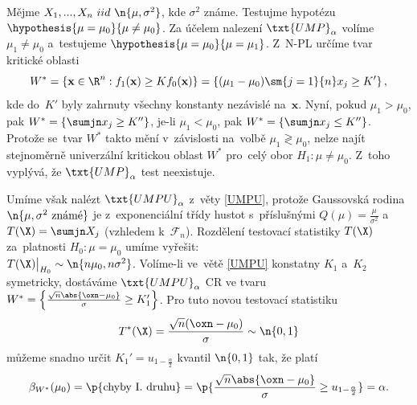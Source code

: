 \begin{example}
	Mějme $X_1,...,X_n~iid~\n{\mu,\sigma^2}$, kde $\sigma^2$ známe. Testujme hypotézu \mbox{$\hypothesis{\mu=\mu_0}{\mu\neq\mu_0}$}.
	Za účelem nalezení $\txt{UMP}_\alpha$ volíme $\mu_1\neq\mu_0$ a~testujeme  $\hypothesis{\mu=\mu_0}{\mu=\mu_1}$. Z~N-PL určíme tvar kritické oblasti 
	$$ W^\ast=\left\{ \textbf{x}\in\R^n:f_1(\textbf{x})\geq Kf_0(\textbf{x}) \right\}=\left\{ (\mu_1-\mu_0)\sm{j=1}{n}x_j\geq K' \right\}, $$
	kde do~$K'$ byly zahrnuty všechny konstanty nezávislé na~$\textbf{x}$. Nyní, pokud $\mu_1>\mu_0$, pak $W^\ast=\left\{ \sumjn x_j\geq K'' \right\}$, je-li $\mu_1<\mu_0$, pak $W^\ast=\left\{ \sumjn x_j\leq K'' \right\}$. Protože se~tvar $W^\ast$ takto mění v~závislosti na~volbě $\mu_1\gtrless \mu_0$, nelze najít stejnoměrně univerzální kritickou oblast $W^\ast$ pro~celý obor $H_1:\mu\neq\mu_0$. Z~toho vyplývá, že $\txt{UMP}_\alpha$ test neexistuje. 
	
	Umíme však nalézt $\txt{UMPU}_\alpha$ z~věty \ref{UMPU}, protože Gaussovská rodina $\n{\mu,\sigma^2\text{ známé}}$ je z~exponenciální třídy hustot s~příslušnými $Q(\mu)=\frac{\mu}{\sigma^2}$ a~$T(\X)=\sumjn X_j$ (vzhledem k~$\mathcal{F}_n$). Rozdělení testovací statistiky $T(\X)$ za~platnosti $H_0:\mu=\mu_0$ umíme vyřešit: \\$T(\X)\big|_{H_0}\sim\n{n\mu_0,n\sigma^2}$. Volíme-li ve~větě \ref{UMPU} konstatny $K_1$ a~$K_2$ symetricky, dostáváme $\txt{UMPU}_\alpha$ CR ve tvaru \mbox{$W^\ast=\left\{ \frac{\sqrt{n}\abs{\oxn-\mu_0}}{\sigma}\geq K_1' \right\}$}. Pro tuto novou testovací statistiku $$T^\ast(\X)=\frac{\sqrt{n}(\oxn-\mu_0)}{\sigma}\sim\n{0,1}$$ můžeme snadno určit $K_1'=u_{1-\frac{\alpha}{2}}$ kvantil $\n{0,1}$ tak, že platí $$ \beta_{W^\ast}(\mu_0)=\p{\text{chyby I. druhu}}=\p{\frac{\sqrt{n}\abs{\oxn-\mu_0}}{\sigma}\geq u_{1-\frac{\alpha}{2}}}=\alpha. $$
\end{example}